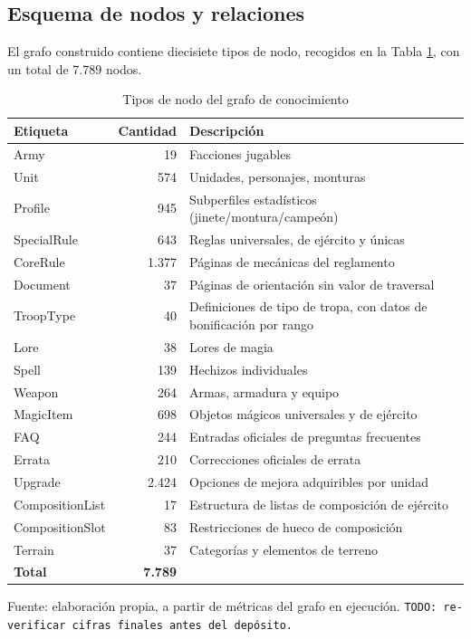 \documentclass[11pt,a4paper,spanish]{book}
\numberwithin{equation}{chapter}
\numberwithin{figure}{chapter}
\numberwithin{table}{chapter}
\begin{document}
\subsection{Esquema de nodos y relaciones}

El grafo construido contiene diecisiete tipos de nodo, recogidos en la Tabla \ref{tab:grafo-nodos}, con un total de 7.789 nodos.

\begin{table}[h]
\centering
{\fontsize{9}{11}\selectfont
\begin{tabular}{|l|r|p{6.5cm}|}
	\hline
	\textbf{Etiqueta} & \textbf{Cantidad} & \textbf{Descripción} \\
	\hline
	Army & 19 & Facciones jugables \\
	\hline
	Unit & 574 & Unidades, personajes, monturas \\
	\hline
	Profile & 945 & Subperfiles estadísticos (jinete/montura/campeón) \\
	\hline
	SpecialRule & 643 & Reglas universales, de ejército y únicas \\
	\hline
	CoreRule & 1.377 & Páginas de mecánicas del reglamento \\
	\hline
	Document & 37 & Páginas de orientación sin valor de traversal \\
	\hline
	TroopType & 40 & Definiciones de tipo de tropa, con datos de bonificación por rango \\
	\hline
	Lore & 38 & Lores de magia \\
	\hline
	Spell & 139 & Hechizos individuales \\
	\hline
	Weapon & 264 & Armas, armadura y equipo \\
	\hline
	MagicItem & 698 & Objetos mágicos universales y de ejército \\
	\hline
	FAQ & 244 & Entradas oficiales de preguntas frecuentes \\
	\hline
	Errata & 210 & Correcciones oficiales de errata \\
	\hline
	Upgrade & 2.424 & Opciones de mejora adquiribles por unidad \\
	\hline
	CompositionList & 17 & Estructura de listas de composición de ejército \\
	\hline
	CompositionSlot & 83 & Restricciones de hueco de composición \\
	\hline
	Terrain & 37 & Categorías y elementos de terreno \\
	\hline
	\textbf{Total} & \textbf{7.789} & \\
	\hline
\end{tabular}
}
\caption{Tipos de nodo del grafo de conocimiento}
\label{tab:grafo-nodos}
{\footnotesize\centering Fuente: elaboración propia, a partir de métricas del grafo en ejecución. \texttt{TODO: re-verificar cifras finales antes del depósito.}\par}
\end{table}
\end{document}

